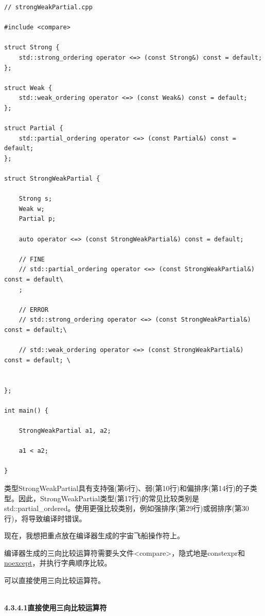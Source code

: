 \begin{lstlisting}[style=styleCXX]
// strongWeakPartial.cpp

#include <compare>

struct Strong {
	std::strong_ordering operator <=> (const Strong&) const = default;
};

struct Weak {
	std::weak_ordering operator <=> (const Weak&) const = default;
};

struct Partial {
	std::partial_ordering operator <=> (const Partial&) const = default;
};

struct StrongWeakPartial {

	Strong s;
	Weak w;
	Partial p;
	
	auto operator <=> (const StrongWeakPartial&) const = default;
	
	// FINE
	// std::partial_ordering operator <=> (const StrongWeakPartial&) const = default\
	;
	
	// ERROR
	// std::strong_ordering operator <=> (const StrongWeakPartial&) const = default;\
	
	// std::weak_ordering operator <=> (const StrongWeakPartial&) const = default; \


};

int main() {

	StrongWeakPartial a1, a2;
	
	a1 < a2;

}
\end{lstlisting}

类型StrongWeakPartial具有支持强(第6行)、弱(第10行)和偏排序(第14行)的子类型。因此，StrongWeakPartial类型(第17行)的常见比较类别是std::partial\_ordered。使用更强比较类别，例如强排序(第29行)或弱排序(第30行)，将导致编译时错误。

现在，我想把重点放在编译器生成的宇宙飞船操作符上。


编译器生成的三向比较运算符需要头文件<compare>，隐式地是constexpr和\href{https://www.modernescpp.com/index.php/c-core-guidelines-the-noexcept-specifier-and-operator}{noexcept}，并执行字典顺序比较。

可以直接使用三向比较运算符。

\hspace*{\fill} \\ %
\noindent
\textbf{4.3.4.1\hspace{0.2cm}直接使用三向比较运算符}

